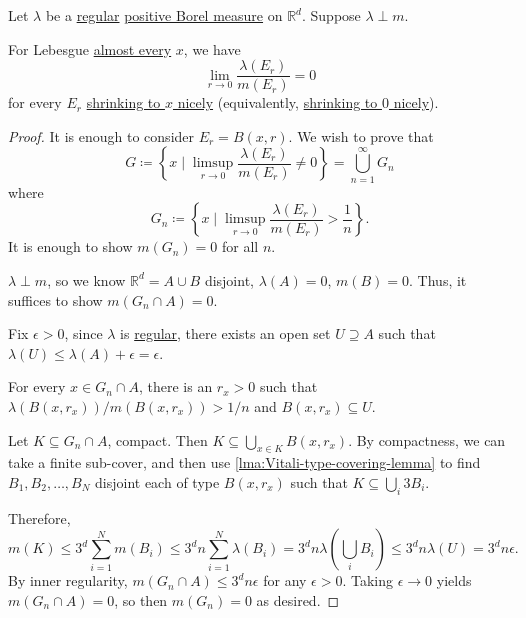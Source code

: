 \begin{proposition}
	Let \(\lambda\) be a \hyperref[def:regular]{regular} \hyperref[def:signed-measure]{positive Borel measure} on \(\mathbb{R}^d\). Suppose \(\lambda \perp m\).

	For Lebesgue \hyperref[def:mu-almost-everywhere]{almost every} \(x\), we have
	\[
		\lim_{r \to 0} \frac{\lambda(E_r)}{m(E_r)} = 0
	\]
	for every \(E_r\) \hyperref[def:shrink-nicely]{shrinking to \(x\) nicely} (equivalently, \hyperref[def:shrink-nicely]{shrinking to \(0\) nicely}).
\end{proposition}

\begin{proof}
	It is enough to consider \(E_r = B(x,r)\). We wish to prove that
	\[
		G \coloneqq \left\{x \mid \limsup_{r \to 0} \frac{\lambda(E_r)}{m(E_r)} \neq 0\right\}  = \bigcup_{n = 1}^\infty G_n
	\]
	where
	\[
		G_n \coloneqq \left\{x \mid \limsup_{r \to 0} \frac{\lambda(E_r)}{m(E_r)} > \frac{1}{n}\right\}.
	\]
	It is enough to show \(m(G_n) = 0\) for all \(n\).

	\(\lambda \perp m\), so we know \(\mathbb{R}^d = A \cup B\) disjoint, \(\lambda(A) = 0\), \(m(B) = 0\). Thus, it suffices to show \(m(G_n \cap A) = 0\).

	Fix \(\epsilon> 0\), since \(\lambda\) is \hyperref[def:regular]{regular}, there exists an open set \(U \supseteq A\) such that \(\lambda(U) \leq \lambda(A) + \epsilon= \epsilon \).

	For every \(x \in G_n \cap A\), there is an \(r_x > 0\) such that \(\lambda(B(x,r_x))/m(B(x,r_x)) > 1/n\) and \(B(x,r_x) \subseteq U\).

	Let \(K \subseteq G_n \cap A\), compact. Then \(K \subseteq \bigcup_{x \in K} B(x,r_x)\). By compactness, we can take a finite sub-cover, and then use
	\autoref{lma:Vitali-type-covering-lemma} to find \(B_1,B_2,\ldots,B_N\) disjoint each of type \(B(x,r_x)\) such that \(K \subseteq \bigcup_i 3B_i\).

	Therefore,
	\[
		m(K) \leq 3^d \sum_{i=1}^N m(B_i) \leq 3^dn\sum_{i=1}^N \lambda(B_i) = 3^d n\lambda\left( \bigcup_i B_i \right) \leq 3^dn\lambda(U) = 3^dn \epsilon .
	\]
	By inner regularity, \(m(G_n \cap A) \leq 3^d n\epsilon\) for any \(\epsilon> 0\). Taking \(\epsilon\to 0\) yields \(m(G_n \cap A) = 0\), so then \(m(G_n) = 0\) as desired.
\end{proof}
